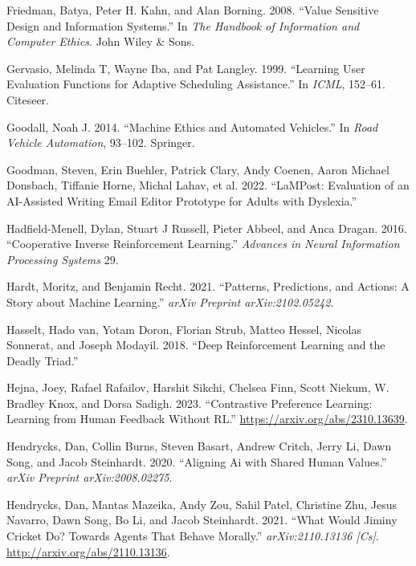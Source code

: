 \documentclass[
  letterpaper,
  numbers=noenddot,
  DIV=11,
  oneside]{scrreprt}
\newlength{\cslhangindent}
\newenvironment{CSLReferences}[2] %
 {\begin{list}{}{%
  \setlength{\itemindent}{0pt}
  \setlength{\leftmargin}{0pt}
  \setlength{\parsep}{0pt}
  \ifodd #1
   \setlength{\leftmargin}{\cslhangindent}
   \setlength{\itemindent}{-1\cslhangindent}
  \fi
  \setlength{\itemsep}{#2\baselineskip}}}
 {\end{list}}
\theoremstyle{remark}
\begin{document}
\begin{CSLReferences}{1}{0}
Friedman, Batya, Peter H. Kahn, and Alan Borning. 2008. {``Value
Sensitive Design and Information Systems.''} In \emph{The Handbook of
Information and Computer Ethics}. John Wiley \& Sons.

Gervasio, Melinda T, Wayne Iba, and Pat Langley. 1999. {``Learning User
Evaluation Functions for Adaptive Scheduling Assistance.''} In
\emph{ICML}, 152--61. Citeseer.

Goodall, Noah J. 2014. {``Machine Ethics and Automated Vehicles.''} In
\emph{Road Vehicle Automation}, 93--102. Springer.

Goodman, Steven, Erin Buehler, Patrick Clary, Andy Coenen, Aaron Michael
Donsbach, Tiffanie Horne, Michal Lahav, et al. 2022. {``LaMPost:
Evaluation of an AI-Assisted Writing Email Editor Prototype for Adults
with Dyslexia.''}

Hadfield-Menell, Dylan, Stuart J Russell, Pieter Abbeel, and Anca
Dragan. 2016. {``Cooperative Inverse Reinforcement Learning.''}
\emph{Advances in Neural Information Processing Systems} 29.

Hardt, Moritz, and Benjamin Recht. 2021. {``Patterns, Predictions, and
Actions: A Story about Machine Learning.''} \emph{arXiv Preprint
arXiv:2102.05242}.

Hasselt, Hado van, Yotam Doron, Florian Strub, Matteo Hessel, Nicolas
Sonnerat, and Joseph Modayil. 2018. {``Deep Reinforcement Learning and
the Deadly Triad.''}

Hejna, Joey, Rafael Rafailov, Harshit Sikchi, Chelsea Finn, Scott
Niekum, W. Bradley Knox, and Dorsa Sadigh. 2023. {``Contrastive
Preference Learning: Learning from Human Feedback Without RL.''}
\url{https://arxiv.org/abs/2310.13639}.

Hendrycks, Dan, Collin Burns, Steven Basart, Andrew Critch, Jerry Li,
Dawn Song, and Jacob Steinhardt. 2020. {``Aligning Ai with Shared Human
Values.''} \emph{arXiv Preprint arXiv:2008.02275}.

Hendrycks, Dan, Mantas Mazeika, Andy Zou, Sahil Patel, Christine Zhu,
Jesus Navarro, Dawn Song, Bo Li, and Jacob Steinhardt. 2021. {``What
{Would} {Jiminy} {Cricket} {Do}? {Towards} {Agents} {That} {Behave}
{Morally}.''} \emph{arXiv:2110.13136 {[}Cs{]}}.
\url{http://arxiv.org/abs/2110.13136}.


\end{CSLReferences}
\end{document}
